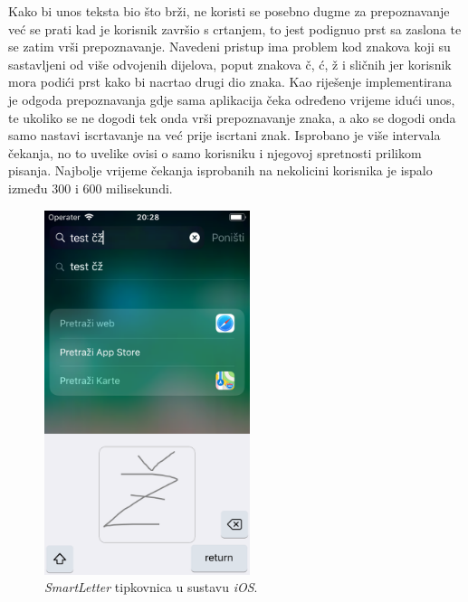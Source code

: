 Kako bi unos teksta bio što brži, ne koristi se posebno dugme za prepoznavanje već se prati kad je korisnik završio s crtanjem, to jest podignuo prst sa zaslona te se zatim vrši prepoznavanje. Navedeni pristup ima problem kod znakova koji su sastavljeni od više odvojenih dijelova, poput znakova č, ć, ž i sličnih jer korisnik mora podići prst kako bi nacrtao drugi dio znaka. Kao riješenje implementirana je odgoda prepoznavanja gdje sama aplikacija čeka određeno vrijeme idući unos, te ukoliko se ne dogodi tek onda vrši prepoznavanje znaka, a ako se dogodi onda samo nastavi iscrtavanje na već prije iscrtani znak. Isprobano je više intervala čekanja, no to uvelike ovisi o samo korisniku i njegovoj spretnosti prilikom pisanja. Najbolje vrijeme čekanja isprobanih na nekolicini korisnika je ispalo između $300$ i $600$ milisekundi.

\begin{figure}[htb]
    \centering
    \includegraphics[width=6cm]{images/app1.png}
    \caption{\emph{SmartLetter} tipkovnica u sustavu \emph{iOS}.}
    \label{fig:keyboard}
\end{figure}

